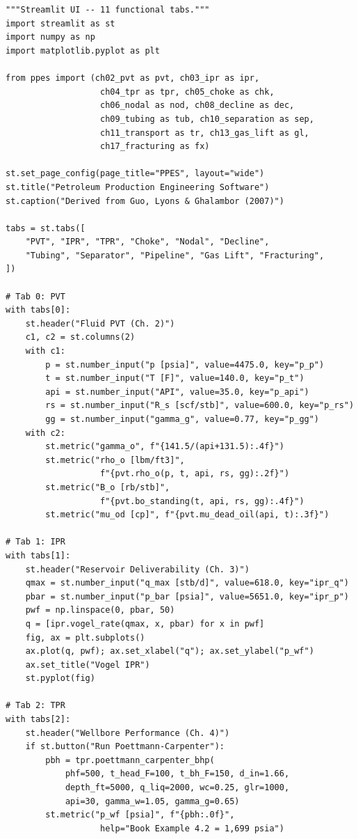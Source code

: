 \documentclass[10pt,a4paper,openany]{book}
\begin{document}
\chapter{}
\begin{lstlisting}
"""Streamlit UI -- 11 functional tabs."""
import streamlit as st
import numpy as np
import matplotlib.pyplot as plt

from ppes import (ch02_pvt as pvt, ch03_ipr as ipr,
                   ch04_tpr as tpr, ch05_choke as chk,
                   ch06_nodal as nod, ch08_decline as dec,
                   ch09_tubing as tub, ch10_separation as sep,
                   ch11_transport as tr, ch13_gas_lift as gl,
                   ch17_fracturing as fx)

st.set_page_config(page_title="PPES", layout="wide")
st.title("Petroleum Production Engineering Software")
st.caption("Derived from Guo, Lyons & Ghalambor (2007)")

tabs = st.tabs([
    "PVT", "IPR", "TPR", "Choke", "Nodal", "Decline",
    "Tubing", "Separator", "Pipeline", "Gas Lift", "Fracturing",
])

# Tab 0: PVT
with tabs[0]:
    st.header("Fluid PVT (Ch. 2)")
    c1, c2 = st.columns(2)
    with c1:
        p = st.number_input("p [psia]", value=4475.0, key="p_p")
        t = st.number_input("T [F]", value=140.0, key="p_t")
        api = st.number_input("API", value=35.0, key="p_api")
        rs = st.number_input("R_s [scf/stb]", value=600.0, key="p_rs")
        gg = st.number_input("gamma_g", value=0.77, key="p_gg")
    with c2:
        st.metric("gamma_o", f"{141.5/(api+131.5):.4f}")
        st.metric("rho_o [lbm/ft3]",
                   f"{pvt.rho_o(p, t, api, rs, gg):.2f}")
        st.metric("B_o [rb/stb]",
                   f"{pvt.bo_standing(t, api, rs, gg):.4f}")
        st.metric("mu_od [cp]", f"{pvt.mu_dead_oil(api, t):.3f}")

# Tab 1: IPR
with tabs[1]:
    st.header("Reservoir Deliverability (Ch. 3)")
    qmax = st.number_input("q_max [stb/d]", value=618.0, key="ipr_q")
    pbar = st.number_input("p_bar [psia]", value=5651.0, key="ipr_p")
    pwf = np.linspace(0, pbar, 50)
    q = [ipr.vogel_rate(qmax, x, pbar) for x in pwf]
    fig, ax = plt.subplots()
    ax.plot(q, pwf); ax.set_xlabel("q"); ax.set_ylabel("p_wf")
    ax.set_title("Vogel IPR")
    st.pyplot(fig)

# Tab 2: TPR
with tabs[2]:
    st.header("Wellbore Performance (Ch. 4)")
    if st.button("Run Poettmann-Carpenter"):
        pbh = tpr.poettmann_carpenter_bhp(
            phf=500, t_head_F=100, t_bh_F=150, d_in=1.66,
            depth_ft=5000, q_liq=2000, wc=0.25, glr=1000,
            api=30, gamma_w=1.05, gamma_g=0.65)
        st.metric("p_wf [psia]", f"{pbh:.0f}",
                   help="Book Example 4.2 = 1,699 psia")


\end{lstlisting}
\end{document}
